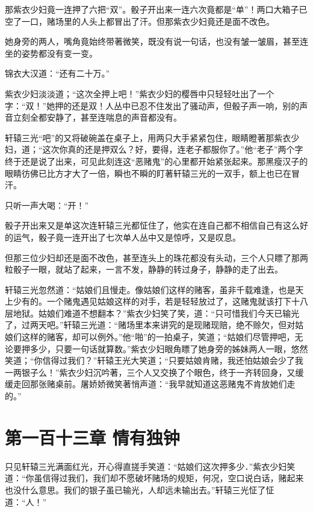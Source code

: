 \documentclass[12pt,oneside]{book}
\begin{document}
那紫衣少妇竟一连押了六把``双''。骰子开出来一连六次竟都是``单''！两口大箱子已空了一口，赌场里的人头上都冒出了汗。但那紫衣少妇竟还是面不改色。

她身旁的两人，嘴角竟始终带著微笑，既没有说一句话，也没有皱一皱眉，甚至连坐的姿势都没有变一变。

锦衣大汉道：``还有二十万。''

紫衣少妇淡淡道；``这次全押上吧！''紫衣少妇的樱唇中只轻轻吐出了一个字：``双！''她押的还是双！人丛中已忍不住发出了骚动声，但骰子声一响，别的声音立刻全都安静了，甚至连喘息的声音都没有。

轩辕三光``吧''的又将破碗盖在桌子上，用两只大手紧紧包住，眼睛瞪著那紫衣少妇，道；``这次你真的还是押双么？好，要得，连老子都服你了。''他``老子''两个字终于还是说了出来，可见此刻连这``恶赌鬼''的心里都开始紧张起来。那黑瘦汉子的眼睛彷佛已比方才大了一倍，瞬也不瞬的盯著轩辕三光的一双手，额上也已在冒汗。

只听一声大喝：``开！''

骰子开出来又是单这次连轩辕三光都怔住了，他实在连自己都不相信自己有这么好的运气，骰子竟一连开出了七次单人丛中又是惊呼，又是叹息。

但那三位少妇却还是面不改色，甚至连头上的珠花都没有头动，三个人只瞟了那两粒骰子一眼，就站了起来，一言不发，静静的转过身子，静静的走了出去。

轩辕三光忽然道：``姑娘们且慢走。像姑娘们这样的赌客，虽非千载难逢，也是天上少有的。一个赌鬼遇见姑娘这样的对手，若是轻轻放过了，这赌鬼就该打下十八层地狱。姑娘们难道不想翻本？''紫衣少妇笑了笑，道：``只可惜我们今天已输光了，过两天吧。''轩辕三光道：``赌场里本来讲究的是现赌现赔，绝不赊欠，但对姑娘们这样的赌客，却可以例外。''他``啪''的一拍桌子，笑道；``姑娘们尽管押吧，无论要押多少，只要一句话就算数。''紫衣少妇眼角瞟了她身旁的姊妹两人一眼，悠然笑道；``你信得过我们？''轩辕王光大笑道；``只要姑娘肯赌，我还怕姑娘会少了我一两银子么！''紫衣少妇沉吟著，三个人又交换了个眼色，终于一齐转回身，又缓缓走回那张赌桌前。屠娇娇微笑著悄声道：``我早就知道这恶赌鬼不肯放她们走的。''

\hypertarget{ux7b2cux4e00ux767eux5341ux4e09ux7ae0-ux60c5ux6709ux72ecux949f}{%
\chapter{第一百十三章
情有独钟}\label{ux7b2cux4e00ux767eux5341ux4e09ux7ae0-ux60c5ux6709ux72ecux949f}}

只见轩辕三光满面红光，开心得直搓手笑道：``姑娘们这次押多少．''紫衣少妇笑道：``你虽信得过我们，我们却不愿破坏赌场的规矩，何况，空口说白话，赌起来也没什么意思。我们的银子虽已输光，人却远未输出去。''轩辕三光怔了怔道：``人！''
\end{document}

